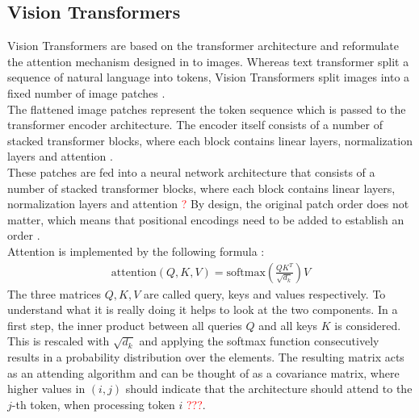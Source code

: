 \subsection{Vision Transformers}
Vision Transformers are based on the transformer architecture and reformulate the attention mechanism designed in \cite{Vaswani2017} to images.
Whereas text transformer split a sequence of natural language into tokens, Vision Transformers split images into a fixed number of image patches \citep{Dosovitskiy2020}.
\\
The flattened image patches represent the token sequence which is passed to the transformer encoder architecture.
The encoder itself consists of a number of stacked transformer blocks, where each block contains linear layers, normalization layers and attention \citep{Vaswani2017,Dosovitskiy2020}.
\\
These patches are fed into a neural network architecture that consists of a number of stacked transformer blocks, where each block contains linear layers, normalization layers and attention \textcolor{red}{?}
By design, the original patch order does not matter, which means that positional encodings need to be added to establish an order \citep{Dosovitskiy2020,Vaswani2017}.
\\
Attention is implemented by the following formula \citep{Vaswani2017}:
\begin{align}
    \text{attention}(Q,K,V) = \text{softmax}(\frac{QK^T}{\sqrt{d_k}})V
\end{align}
The three matrices $Q,K,V$ are called query, keys and values respectively.
To understand what it is really doing it helps to look at the two components.
In a first step, the inner product between all queries $Q$ and all keys $K$ is considered.
This is rescaled with $\sqrt{d_k}$ and applying the softmax function consecutively results in a probability distribution over the elements.
The resulting matrix acts as an attending algorithm and can be thought of as a covariance matrix, where higher values in $(i,j)$ should indicate that the architecture should attend to the $j$-th token, when processing token $i$ \citep{Vaswani2017} \textcolor{red}{???}.    
\par
